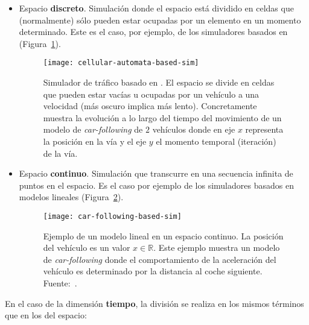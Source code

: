 \begin{itemize}
	\item Espacio \textbf{discreto}. Simulación donde el espacio está dividido en celdas que (normalmente) sólo pueden estar ocupadas por un elemento en un momento determinado. Este es el caso, por ejemplo, de los simuladores basados en  (Figura~\ref{fig:cellular-automata-based-sim}).

	\begin{figure}
		\centering
		\texttt{[image: cellular-automata-based-sim]}
		\caption[Ejemplo de simulador basado en ]{Simulador de tráfico basado en . El espacio se divide en celdas que pueden estar vacías u ocupadas por un vehículo a una velocidad (más oscuro implica más lento). Concretamente muestra la evolución a lo largo del tiempo del movimiento de un modelo de \textit{\gls{car-following}} de $2$ vehículos donde en eje $x$ representa la posición en la vía y el eje $y$ el momento temporal (iteración) de la vía.}
		\label{fig:cellular-automata-based-sim}
	\end{figure}

	\item Espacio \textbf{continuo}. Simulación que transcurre en una secuencia infinita de puntos en el espacio. Es el caso por ejemplo de los simuladores basados en modelos lineales (Figura~\ref{fig:car-following-based-sim}).
	
	
	\begin{figure}
		\centering
		\texttt{[image: car-following-based-sim]}
		\caption[Ejemplo de modelo lineal en un espacio continuo]{Ejemplo de un modelo lineal en un espacio continuo. La posición del vehículo es un valor $x \in \mathbb{R}$. Este ejemplo muestra un modelo de \textit{\gls{car-following}} donde el comportamiento de la aceleración del vehículo es determinado por la distancia al coche siguiente. Fuente:~\cite{Tordeux2011}.}
		\label{fig:car-following-based-sim}
	\end{figure}
	
\end{itemize}

En el caso de la dimensión \textbf{tiempo}, la división se realiza en los mismos términos que en los del espacio:


